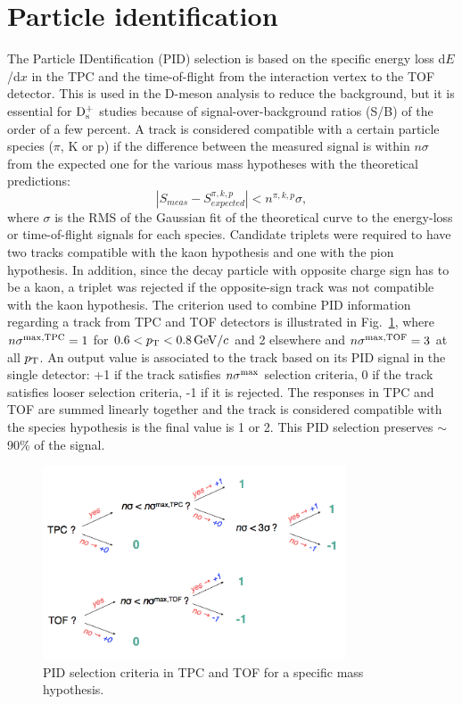 \section{Particle identification}
The Particle IDentification (PID) selection is based on the specific energy loss 
d$E$/d$x$ in the TPC and the time-of-flight from the interaction vertex to the 
TOF detector. This is used in the D-meson analysis to reduce the background, 
but it is essential for ${\rm D_s^+}$ studies because of signal-over-background
 ratios (S/B) of the order of a few percent.
A track is  considered compatible with a certain particle species 
($\pi$, K or p) if the difference between the measured signal is
 within $n\sigma$ from the expected one for the various mass hypotheses
  with the theoretical predictions:
\[
|S_{meas}-S^{\pi,k,p}_{expected}| < n^{\pi,k,p}\sigma ,
\]
where $\sigma$ is the RMS of the Gaussian fit of the theoretical 
curve to the energy-loss or time-of-flight signals for each species.
Candidate triplets were required to have two tracks compatible with 
the kaon hypothesis and one with the pion hypothesis. In addition, 
since the decay particle with opposite charge sign has to be a kaon, 
a triplet was rejected if the opposite-sign track was not compatible 
with the kaon hypothesis. 
The criterion used to combine PID information regarding a track from TPC and TOF
detectors is illustrated in Fig.~\ref{fig:strongPID}, where $n\sigma^{\rm max,TPC} = 1$ for
$0.6 < p_{\rm T} < 0.8 \, \mathrm{GeV}/c$ and 2 elsewhere and $n\sigma^{\rm max,TOF} = 3$ at all $p_{\rm T}$.  
An output value is associated to the track based on its PID signal in the single
detector: +1 if the track
satisfies $n\sigma^{\rm max}$ selection criteria, 0 if the track satisfies looser selection criteria,
-1 if it is rejected. The responses in TPC and TOF are summed linearly together and the track is considered
compatible with the species hypothesis is the final value is 1 or 2. This
PID selection preserves $\sim$90\% of the signal.


 
\begin{figure}[!h]
\centering
\includegraphics[width=9cm]{FigCap4/strongPID.png}
\caption{PID selection criteria in TPC and TOF for a specific mass hypothesis.}
\label{fig:strongPID}
\end{figure}


